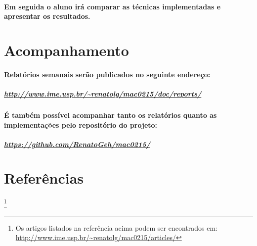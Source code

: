 \documentclass[a4paper,10pt]{article}
\newcommand\blfootnote[1]{%
  \begingroup
  \renewcommand\thefootnote{}\footnote{#1}%
  \addtocounter{footnote}{-1}%
  \endgroup
}
\theoremstyle{plain}
\begin{document}
\paragraph{
  Em seguida o aluno irá comparar as técnicas implementadas e apresentar os resultados.
}

\section{Acompanhamento}

\paragraph{
  Relatórios semanais serão publicados no seguinte endereço: 
}

\subparagraph{\url{http://www.ime.usp.br/~renatolg/mac0215/doc/reports/}}

\paragraph{
  É também possível acompanhar tanto os relatórios quanto as implementações pelo repositório
do projeto:
}

\subparagraph{\url{https://github.com/RenatoGeh/mac0215/}}

\newpage

\section{Referências}

\printbibliography[title={Artigos},type=article]
\printbibliography[title={Websites},type=misc]

\blfootnote{Os artigos listados na referência acima podem ser encontrados em: 
  \url{http://www.ime.usp.br/~renatolg/mac0215/articles/}}
\end{document}
